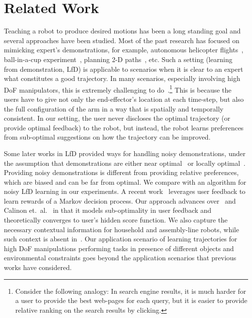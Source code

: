 \section{Related Work}
\label{relwork}

Teaching a robot to produce desired motions has been a long standing goal and several approaches have been studied.  Most of the past research has focused on mimicking expert's demonstrations, for example, autonomous helicopter flights~\citep{Abbeel10}, ball-in-a-cup experiment~\citep{Kober11}, planning 2-D paths~\citep{Ratliff07b,Ratliff09b,Ratliff06}, etc.  Such a setting (learning from demonstration, LfD) is applicable to scenarios when it is clear to an expert what constitutes a good trajectory. In many scenarios, especially involving high DoF manipulators, this is extremely challenging to
do~\citep{Akgun12}.\footnote{Consider the following analogy:  In search engine results, it is much harder for a user to provide the best web-pages for each query, but it is easier to provide relative ranking on the search results by clicking.} This is because the users have to give not only the end-effector's location at each time-step, but also the full configuration of the arm in a way that is spatially and temporally consistent. In our setting, the user never discloses the optimal trajectory (or provide optimal feedback) to the robot, but instead, the robot learns preferences from sub-optimal suggestions on how the trajectory can be improved.

Some later works in LfD provided ways for handling noisy demonstrations, under the assumption that demonstrations are either near optimal~\citep{Ziebart08} or locally optimal~\citep{Levine12}. Providing noisy demonstrations is different from providing relative preferences, which are biased and can be far from optimal. We compare with an algorithm for noisy LfD learning in our experiments. A recent work~\citep{Wilson12} leverages user feedback to learn rewards of a Markov decision process. Our approach advances over~\citep{Wilson12} and Calinon et.~al.~\citep{Calinon07} in that it models sub-optimality in user feedback and theoretically converges to user's hidden score function. We also capture the necessary contextual information for household and assembly-line robots, while such context is absent in~\citep{Calinon07,Wilson12}. Our application scenario of learning trajectories for high DoF manipulations performing tasks in presence of different objects and environmental constraints goes beyond the application scenarios that previous works have considered. 

